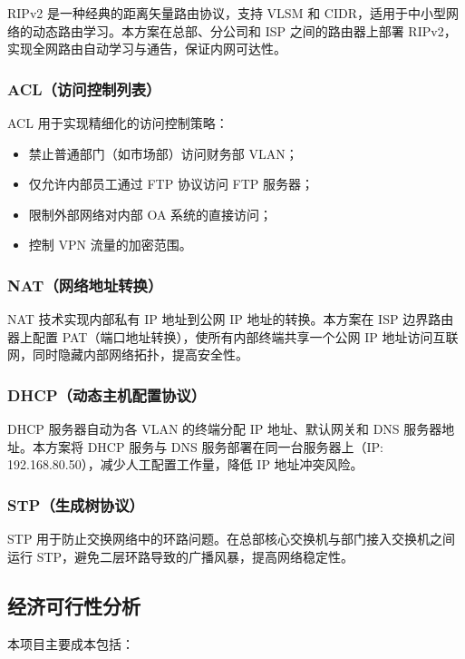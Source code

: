 \documentclass[12pt,a4paper]{ctexart}
\begin{document}
RIPv2 是一种经典的距离矢量路由协议，支持 VLSM 和 CIDR，适用于中小型网络的动态路由学习。本方案在总部、分公司和 ISP 之间的路由器上部署 RIPv2，实现全网路由自动学习与通告，保证内网可达性。

\subsubsection{ACL（访问控制列表）}

ACL 用于实现精细化的访问控制策略：
\begin{itemize}
    \item 禁止普通部门（如市场部）访问财务部 VLAN；
    \item 仅允许内部员工通过 FTP 协议访问 FTP 服务器；
    \item 限制外部网络对内部 OA 系统的直接访问；
    \item 控制 VPN 流量的加密范围。
\end{itemize}

\subsubsection{NAT（网络地址转换）}

NAT 技术实现内部私有 IP 地址到公网 IP 地址的转换。本方案在 ISP 边界路由器上配置 PAT（端口地址转换），使所有内部终端共享一个公网 IP 地址访问互联网，同时隐藏内部网络拓扑，提高安全性。

\subsubsection{DHCP（动态主机配置协议）}

DHCP 服务器自动为各 VLAN 的终端分配 IP 地址、默认网关和 DNS 服务器地址。本方案将 DHCP 服务与 DNS 服务部署在同一台服务器上（IP: 192.168.80.50），减少人工配置工作量，降低 IP 地址冲突风险。

\subsubsection{STP（生成树协议）}

STP 用于防止交换网络中的环路问题。在总部核心交换机与部门接入交换机之间运行 STP，避免二层环路导致的广播风暴，提高网络稳定性。

\subsection{经济可行性分析}

本项目主要成本包括：
\end{document}
